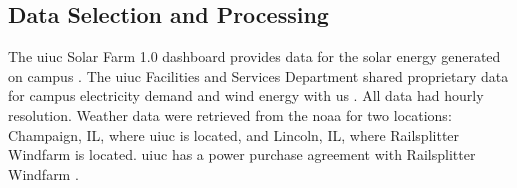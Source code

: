 \subsection{Data Selection and Processing}

The \gls{uiuc} Solar Farm 1.0 dashboard provides data for the solar energy
generated  on campus \cite{alsoenergy_university_2019}. The \gls{uiuc}
Facilities and Services Department shared proprietary data for campus
electricity demand and wind energy with us \cite{marquissee_campus_2019}. All
data had hourly resolution. Weather data were retrieved from the
\gls{noaa}\cite{national_center_for_environmental_information_find_nodate} for
two locations: Champaign, IL, where \gls{uiuc} is located, and Lincoln, IL,
where Railsplitter Windfarm is located. \gls{uiuc} has a power purchase
agreement with Railsplitter Windfarm \cite{breitweiser_wind_2016}.


